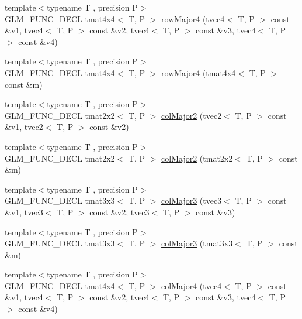 \begin{DoxyCompactItemize}
\item 
{\footnotesize template$<$typename T , precision P$>$ }\\G\+L\+M\+\_\+\+F\+U\+N\+C\+\_\+\+D\+E\+C\+L tmat4x4$<$ T, P $>$ \hyperlink{group__gtx__matrix__major__storage_ga3ce8f2a78fb2f15bf28151ee128b0ae8}{row\+Major4} (tvec4$<$ T, P $>$ const \&v1, tvec4$<$ T, P $>$ const \&v2, tvec4$<$ T, P $>$ const \&v3, tvec4$<$ T, P $>$ const \&v4)
\item 
{\footnotesize template$<$typename T , precision P$>$ }\\G\+L\+M\+\_\+\+F\+U\+N\+C\+\_\+\+D\+E\+C\+L tmat4x4$<$ T, P $>$ \hyperlink{group__gtx__matrix__major__storage_ga85771a88c114a088a0414bcfce55e729}{row\+Major4} (tmat4x4$<$ T, P $>$ const \&m)
\item 
{\footnotesize template$<$typename T , precision P$>$ }\\G\+L\+M\+\_\+\+F\+U\+N\+C\+\_\+\+D\+E\+C\+L tmat2x2$<$ T, P $>$ \hyperlink{group__gtx__matrix__major__storage_ga599fff4f1c65912b256a82138ebcca37}{col\+Major2} (tvec2$<$ T, P $>$ const \&v1, tvec2$<$ T, P $>$ const \&v2)
\item 
{\footnotesize template$<$typename T , precision P$>$ }\\G\+L\+M\+\_\+\+F\+U\+N\+C\+\_\+\+D\+E\+C\+L tmat2x2$<$ T, P $>$ \hyperlink{group__gtx__matrix__major__storage_ga5cfd25de9d5b4c6a825085f38ddfeff7}{col\+Major2} (tmat2x2$<$ T, P $>$ const \&m)
\item 
{\footnotesize template$<$typename T , precision P$>$ }\\G\+L\+M\+\_\+\+F\+U\+N\+C\+\_\+\+D\+E\+C\+L tmat3x3$<$ T, P $>$ \hyperlink{group__gtx__matrix__major__storage_ga3a55e2948193e91733e434e7cc3c1540}{col\+Major3} (tvec3$<$ T, P $>$ const \&v1, tvec3$<$ T, P $>$ const \&v2, tvec3$<$ T, P $>$ const \&v3)
\item 
{\footnotesize template$<$typename T , precision P$>$ }\\G\+L\+M\+\_\+\+F\+U\+N\+C\+\_\+\+D\+E\+C\+L tmat3x3$<$ T, P $>$ \hyperlink{group__gtx__matrix__major__storage_gaa93f3dcc47ced18e5db4a853363d9386}{col\+Major3} (tmat3x3$<$ T, P $>$ const \&m)
\item 
{\footnotesize template$<$typename T , precision P$>$ }\\G\+L\+M\+\_\+\+F\+U\+N\+C\+\_\+\+D\+E\+C\+L tmat4x4$<$ T, P $>$ \hyperlink{group__gtx__matrix__major__storage_ga2829de096bb67ab5cd670958f3d402b6}{col\+Major4} (tvec4$<$ T, P $>$ const \&v1, tvec4$<$ T, P $>$ const \&v2, tvec4$<$ T, P $>$ const \&v3, tvec4$<$ T, P $>$ const \&v4)

\end{DoxyCompactItemize}
